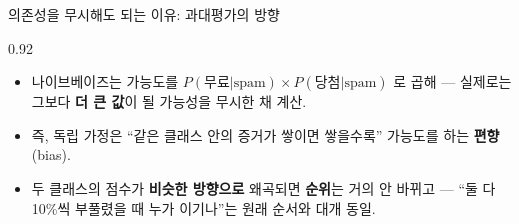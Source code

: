 \begin{frame}{의존성을 무시해도 되는 이유: 과대평가의 방향}
\begin{center}\begin{varwidth}{0.92\textwidth}
  \begin{itemize}
    
    \item 나이브베이즈는 가능도를
      $P(\text{무료}|\text{spam})\times P(\text{당첨}|\text{spam})$
      로 곱해 --- 실제로는 그보다 \textbf{더 큰 값}이 될 가능성을
      무시한 채 계산.
    \item 즉, 독립 가정은 ``같은 클래스 안의 증거가 쌓이면 쌓을수록''
      가능도를 하는 \textbf{편향}(bias).
    
    \item 두 클래스의 점수가 \textbf{비슷한 방향으로} 왜곡되면
      \textbf{순위}는 거의 안 바뀌고 --- ``둘 다 10\%씩 부풀렸을 때
      누가 이기나''는 원래 순서와 대개 동일.
  \end{itemize}
\end{varwidth}\end{center}
\end{frame}
